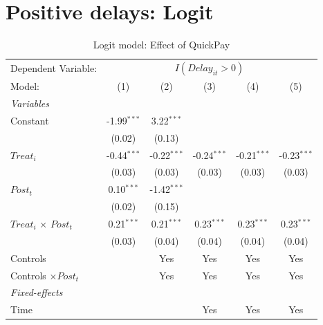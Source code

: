 \documentclass[
]{article}
\begin{document}
\hypertarget{positive-delays-logit}{%
\section{Positive delays: Logit}\label{positive-delays-logit}}

\begin{table}[htbp]
   \caption{Logit model: Effect of QuickPay}
   \centering
   \begin{tabular}{lccccc}
      \tabularnewline \midrule \midrule
      Dependent Variable: & \multicolumn{5}{c}{$I(Delay_{it}>0)$}\\
      Model:                       & (1)           & (2)           & (3)           & (4)           & (5)\\  
      \midrule
      \emph{Variables}\\
      Constant                     & -1.99$^{***}$ & 3.22$^{***}$  &               &               &   \\   
                                   & (0.02)        & (0.13)        &               &               &   \\   
      $Treat_i$                    & -0.44$^{***}$ & -0.22$^{***}$ & -0.24$^{***}$ & -0.21$^{***}$ & -0.23$^{***}$\\   
                                   & (0.03)        & (0.03)        & (0.03)        & (0.03)        & (0.03)\\   
      $Post_t$                     & 0.10$^{***}$  & -1.42$^{***}$ &               &               &   \\   
                                   & (0.02)        & (0.15)        &               &               &   \\   
      $Treat_i$ $\times$ $Post_t$  & 0.21$^{***}$  & 0.21$^{***}$  & 0.23$^{***}$  & 0.23$^{***}$  & 0.23$^{***}$\\   
                                   & (0.03)        & (0.04)        & (0.04)        & (0.04)        & (0.04)\\   
      Controls                     &               & Yes           & Yes           & Yes           & Yes\\  
      Controls $\times Post_t$     &               & Yes           & Yes           & Yes           & Yes\\  
      \midrule
      \emph{Fixed-effects}\\
      Time                         &               &               & Yes           & Yes           & Yes\\  

\end{tabular}
\end{table}
\end{document}

